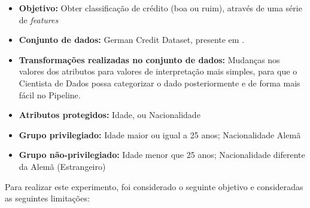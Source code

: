 \documentclass[portugues]{ic-tese}
\begin{document}
\begin{itemize}
\item \textbf{Objetivo:} Obter classificação de crédito (boa ou ruim), através de uma série de \textit{features}

\item \textbf{Conjunto de dados:} German Credit Dataset, presente em \citep{ucigerman_2021}.

\item \textbf{Transformações realizadas no conjunto de dados:} Mudanças nos valores dos atributos para valores de interpretação mais simples, para que o Cientista de Dados possa categorizar o dado posteriormente e de forma mais fácil no Pipeline.

\item \textbf{Atributos protegidos:} Idade, ou Nacionalidade

\item \textbf{Grupo privilegiado:} Idade maior ou igual a 25 anos; Nacionalidade Alemã

\item \textbf{Grupo não-privilegiado:} Idade menor que 25 anos; Nacionalidade diferente da Alemã (Estrangeiro)

\end{itemize}

Para realizar este experimento, foi considerado o seguinte objetivo e consideradas as seguintes limitações:
\end{document}
